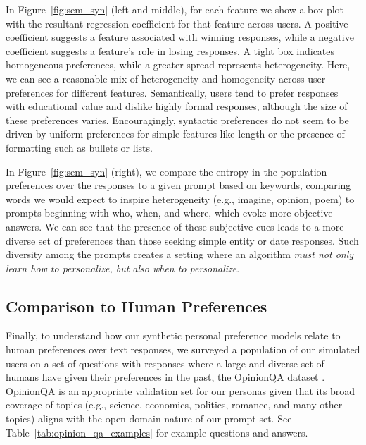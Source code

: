 In Figure~\ref{fig:sem_syn} (left and middle), for each feature we show a box plot with the resultant regression coefficient for that feature across users.  A positive coefficient suggests a feature associated with winning responses, while a negative coefficient suggests a feature's role in losing responses.  A tight box indicates homogeneous preferences, while a greater spread represents heterogeneity.
Here, we can see a reasonable mix of heterogeneity and homogeneity across user preferences for different features. 
Semantically, users tend to prefer responses with educational value and dislike highly formal responses, although the size of these preferences varies.
Encouragingly, syntactic preferences do not seem to be driven by uniform preferences for simple features like length or the presence of formatting such as bullets or lists.

In Figure~\ref{fig:sem_syn} (right), we compare the entropy in the population preferences over the responses to a given prompt based on keywords, comparing words we would expect to inspire heterogeneity (e.g., imagine, opinion, poem) to prompts beginning with who, when, and where, which evoke more objective answers.  We can see that the presence of these subjective cues leads to a more diverse set of preferences than those seeking simple entity or date responses.  Such diversity among the prompts creates a setting where an algorithm \textit{must not only learn how to personalize, but also when to personalize}.

\subsection{Comparison to Human Preferences}

Finally, to understand how our synthetic personal preference models relate to human preferences over text responses, we surveyed a population of our simulated users on a set of questions with responses where a large and diverse set of humans have given their preferences in the past, the OpinionQA dataset
\citep{santurkar2023opinions}.
OpinionQA is an appropriate validation set for our personas given that its broad coverage of topics (e.g., science, economics, politics, romance, and many other topics) aligns with the open-domain nature of our prompt set.  See Table~\ref{tab:opinion_qa_examples} for example questions and answers.

